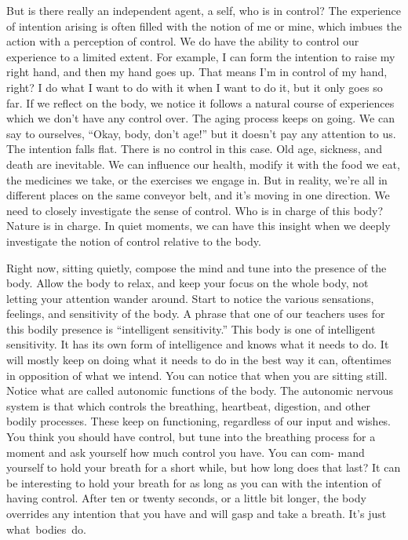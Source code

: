 \enlargethispage{1\baselineskip}
{\parfillskip=0pt
But is there really an independent agent, a self, who is in control? The experience of intention arising is often filled with the notion of me or mine, which imbues \linebreak the action with a perception of control. We do have the \linebreak ability to control our experience to a limited extent. For example, I can form the intention to raise my right hand, and then my hand goes up. That means I'm in control of my hand, right? I do what I want to do with it when I want to do it, but it only goes so far. If we reflect on the body, we notice it follows a natural course of experiences which we don't have any control over. The aging process keeps on going. We can say to ourselves, ``Okay, body, don't age!'' but it doesn't pay any attention to us. The intention falls flat. There is no control in this case. Old age, sickness, and death are inevitable. We can influence our health, modify it with the food we eat, the medicines we take, or the exercises we engage in. But in reality, we're all in different places on the same conveyor belt, and it's moving in one direction. We need to closely investigate the sense of control. Who is in charge of this body? Nature is in charge. In quiet moments, we can have this insight when we deeply investigate the notion of control relative to the body.
\par}

Right now, sitting quietly, compose the mind and tune into the presence of the body. Allow the body to relax, and keep your focus on the whole body, not letting your attention wander around. Start to notice the various sensations, feelings, and sensitivity of the body. A phrase that one of our teachers uses for this bodily presence is ``intelligent sensitivity.'' This body is one of intelligent sensitivity. It has its own form of intelligence and knows what it needs to do. It will mostly keep on doing what it needs to do in the best way it can, oftentimes in opposition of what we intend. You \linebreak can notice that when you are sitting still. Notice what are called autonomic functions of the body. The autonomic nervous system is that which controls the \mbox{breathing,} heartbeat, digestion, and other bodily processes. These keep on functioning, regardless of our input and wishes. You think you should have control, but tune into the breathing process for a moment and ask yourself how much control you have. You can com- \linebreak mand yourself to hold your breath for a short while, but how long does that last? It can be interesting to hold your breath for as long as you can with the intention of having control. After ten or twenty seconds, or \linebreak a little bit longer, the body overrides any intention that you have and will gasp and take a breath. It's just \mbox{what bodies do.}

